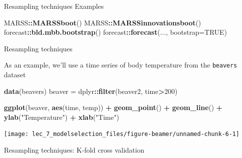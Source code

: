 \documentclass[ignorenonframetext,]{beamer}
\newenvironment{Shaded}{\begin{snugshade}}{\end{snugshade}}
\newcommand{\DataTypeTok}[1]{\textcolor[rgb]{0.13,0.29,0.53}{#1}}
\newcommand{\DecValTok}[1]{\textcolor[rgb]{0.00,0.00,0.81}{#1}}
\newcommand{\KeywordTok}[1]{\textcolor[rgb]{0.13,0.29,0.53}{\textbf{#1}}}
\newcommand{\NormalTok}[1]{#1}
\newcommand{\OperatorTok}[1]{\textcolor[rgb]{0.81,0.36,0.00}{\textbf{#1}}}
\newcommand{\OtherTok}[1]{\textcolor[rgb]{0.56,0.35,0.01}{#1}}
\newcommand{\StringTok}[1]{\textcolor[rgb]{0.31,0.60,0.02}{#1}}
\begin{document}
\begin{frame}[fragile]
\begin{block}{Resampling techniques}
Examples

\begin{Shaded}
\begin{Highlighting}[]
\NormalTok{MARSS}\OperatorTok{::}\KeywordTok{MARSSboot}\NormalTok{()}
\NormalTok{MARSS}\OperatorTok{::}\KeywordTok{MARSSinnovationsboot}\NormalTok{()}
\NormalTok{forecast}\OperatorTok{::}\KeywordTok{bld.mbb.bootstrap}\NormalTok{()}
\NormalTok{forecast}\OperatorTok{::}\KeywordTok{forecast}\NormalTok{(..., }\DataTypeTok{bootstrap=}\OtherTok{TRUE}\NormalTok{)}
\end{Highlighting}
\end{Shaded}

\end{block}

\begin{block}{Resampling techniques}

As an example, we'll use a time series of body temperature from the
\texttt{beavers} dataset

\begin{Shaded}
\begin{Highlighting}[]
\KeywordTok{data}\NormalTok{(beavers)}
\NormalTok{beaver =}\StringTok{ }\NormalTok{dplyr}\OperatorTok{::}\KeywordTok{filter}\NormalTok{(beaver2, time}\OperatorTok{>}\DecValTok{200}\NormalTok{)}
\end{Highlighting}
\end{Shaded}

\begin{Shaded}
\begin{Highlighting}[]
\KeywordTok{ggplot}\NormalTok{(beaver, }\KeywordTok{aes}\NormalTok{(time, temp)) }\OperatorTok{+}\StringTok{ }
\StringTok{  }\KeywordTok{geom_point}\NormalTok{() }\OperatorTok{+}\StringTok{ }\KeywordTok{geom_line}\NormalTok{() }\OperatorTok{+}\StringTok{ }
\StringTok{  }\KeywordTok{ylab}\NormalTok{(}\StringTok{"Temperature"}\NormalTok{) }\OperatorTok{+}\StringTok{ }\KeywordTok{xlab}\NormalTok{(}\StringTok{"Time"}\NormalTok{)}
\end{Highlighting}
\end{Shaded}

\begin{center}\texttt{[image: lec\_7\_modelselection\_files/figure-beamer/unnamed-chunk-6-1]} \end{center}

\end{block}

\begin{block}{Resampling techniques: K-fold cross validation}


\end{block}
\end{frame}
\end{document}
